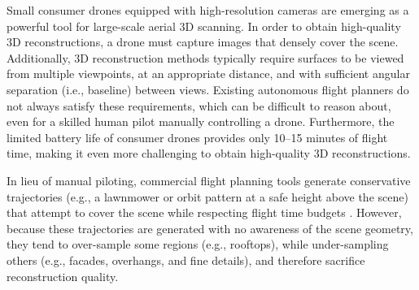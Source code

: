 
Small consumer drones equipped with high-resolution cameras are emerging as a powerful tool for large-scale aerial 3D scanning.
In order to obtain high-quality 3D reconstructions, a drone must capture images that densely cover the scene.
Additionally, 3D reconstruction methods typically require surfaces to be viewed from multiple viewpoints, at an appropriate distance, and with sufficient angular separation (i.e., baseline) between views.
Existing autonomous flight planners do not always satisfy these  requirements, which can be difficult to reason about, even for a skilled human pilot manually controlling a drone.
Furthermore, the limited battery life of consumer drones provides only 10--15 minutes of flight time, making it even more challenging to obtain high-quality 3D reconstructions.


In lieu of manual piloting, commercial flight planning tools generate conservative trajectories (e.g., a lawnmower or orbit pattern at a safe height above the scene) that attempt to cover the scene while respecting flight time budgets \cite{3dr:2017a,pix4d:2017a}.
However, because these trajectories are generated with no awareness of the scene geometry, they tend to over-sample some regions (e.g., rooftops), while under-sampling others (e.g., facades, overhangs, and fine details), and therefore sacrifice reconstruction quality.


